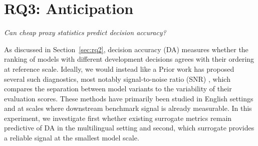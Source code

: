 \section{RQ3: Anticipation}
\label{sec:rq3}

\begin{rquestion}
\textit{Can cheap proxy statistics predict decision accuracy?}    
\end{rquestion}



As discussed in Section~\ref{sec:rq2}, decision accuracy (DA) measures whether the ranking of models with different development decisions agrees with their ordering at reference scale.
Ideally, we would instead like a 
Prior work has proposed several such diagnostics, most notably signal-to-noise ratio (SNR) \citep{heineman_signal_2025}, which compares the separation between model variants to the variability of their evaluation scores.
These methods have primarily been studied in English settings and at scales where downstream benchmark signal is already measurable.
In this experiment, we investigate first whether existing surrogate metrics remain predictive of DA in the multilingual setting and second, which surrogate provides a reliable signal at the smallest model scale.

